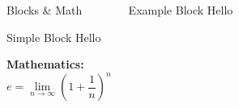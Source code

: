 \documentclass[final]{beamer}
\begin{document}
\begin{frame}[t,fragile]{}
\begin{center}
\begin{minipage}{0.9\paperwidth}
\begin{columns}[t,totalwidth=\textwidth]
          \begin{block}{Blocks \& Math}
            \begin{block}{Simple Block}
              Hello
            \end{block}
            
            \vspace{0.3cm}
            \textbf{Mathematics:}
            \[
              e = \lim_{n\to \infty} {\left(1 + \frac{1}{n}\right)}^n
            \]
          \end{block}
          \vspace{0.5cm}
          \begin{exampleblock}{Example Block}
            Hello
          \end{exampleblock}
     

\end{columns}
\end{minipage}
\end{center}
\end{frame}
\end{document}
